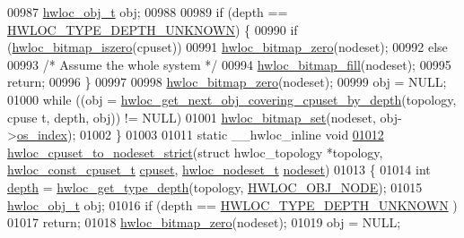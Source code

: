 \begin{DoxyCode}
{{00987         \hyperlink{a00016}{hwloc_obj_t} obj;
00988 
00989         \textcolor{keywordflow}{if} (depth == \hyperlink{a00046_ggaf4e663cf42bbe20756b849c6293ef575a0565ab92ab72cb0cec91e23003294aad}{HWLOC_TYPE_DEPTH_UNKNOWN}) \{
00990                  \textcolor{keywordflow}{if} (\hyperlink{a00065_gaa94fed35d2a598bc4a8657b6955b7bf5}{hwloc_bitmap_iszero}(cpuset))
00991                         \hyperlink{a00065_ga6c540b9fe63b8223b6aba46d56dd63b8}{hwloc_bitmap_zero}(nodeset);
00992                 \textcolor{keywordflow}{else}
00993                         \textcolor{comment}{/* Assume the whole system */}
00994                         \hyperlink{a00065_ga52456f7ef79d68e610cb65e3f7ffafad}{hwloc_bitmap_fill}(nodeset);
00995                 \textcolor{keywordflow}{return};
00996         \}
00997 
00998         \hyperlink{a00065_ga6c540b9fe63b8223b6aba46d56dd63b8}{hwloc_bitmap_zero}(nodeset);
00999         obj = NULL;
01000         \textcolor{keywordflow}{while} ((obj = \hyperlink{a00056_ga2f9a4ec15e9cfae8c21501257a51ce5b}{hwloc_get_next_obj_covering_cpuset_by_depth}(topology, cpuse
      t, depth, obj)) != NULL)
01001                 \hyperlink{a00065_ga497556af0cc34f109ae0277999c074d3}{hwloc_bitmap_set}(nodeset, obj->\hyperlink{a00016_a61a7a80a68eaccbaaa28269e678c81a9}{os_index});
01002 \}
01003 
01011 \textcolor{keyword}{static} \_\_hwloc\_inline \textcolor{keywordtype}{void}
\hypertarget{a00031_source_l01012}{}\hyperlink{a00062_ga9162785e39d7c697f76f99524c4a2fb4}{01012} \hyperlink{a00062_ga9162785e39d7c697f76f99524c4a2fb4}{hwloc_cpuset_to_nodeset_strict}(\textcolor{keyword}{struct} hwloc\_topology *topology, 
      \hyperlink{a00040_ga1f784433e9b606261f62d1134f6a3b25}{hwloc_const_cpuset_t} \hyperlink{a00016_a67925e0f2c47f50408fbdb9bddd0790f}{cpuset}, \hyperlink{a00040_ga37e35730fa7e775b5bb0afe893d6d508}{hwloc_nodeset_t} \hyperlink{a00016_a08f0d0e16c619a6e653526cbee4ffea3}{nodeset})
01013 \{
01014         \textcolor{keywordtype}{int} \hyperlink{a00016_a9d82690370275d42d652eccdea5d3ee5}{depth} = \hyperlink{a00046_gaea7c64dd59467f5201ba87712710b14d}{hwloc_get_type_depth}(topology, \hyperlink{a00041_ggacd37bb612667dc437d66bfb175a8dc55aaf0964881117bdedf1a5e9332cd120dd}{HWLOC_OBJ_NODE});
01015         \hyperlink{a00016}{hwloc_obj_t} obj;
01016         \textcolor{keywordflow}{if} (depth == \hyperlink{a00046_ggaf4e663cf42bbe20756b849c6293ef575a0565ab92ab72cb0cec91e23003294aad}{HWLOC_TYPE_DEPTH_UNKNOWN} )
01017                 \textcolor{keywordflow}{return};
01018         \hyperlink{a00065_ga6c540b9fe63b8223b6aba46d56dd63b8}{hwloc_bitmap_zero}(nodeset);
01019         obj = NULL;
}}
\end{DoxyCode}
